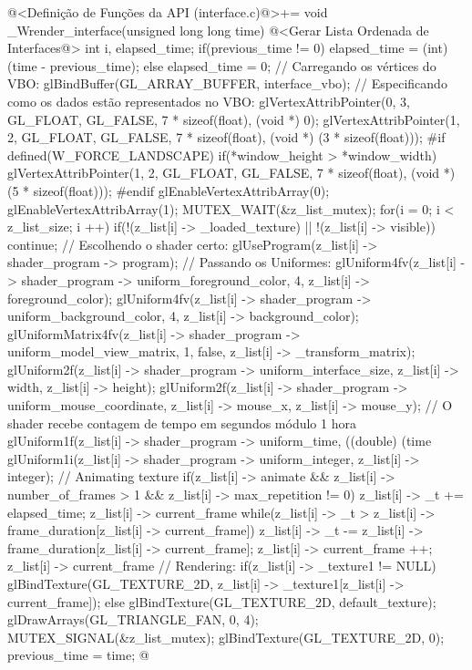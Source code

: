 \iniciocodigo
@<Definição de Funções da API (interface.c)@>+=
void _Wrender_interface(unsigned long long time){
  @<Gerar Lista Ordenada de Interfaces@>
  {
    int i, elapsed_time;
    if(previous_time != 0)
      elapsed_time = (int) (time - previous_time);
    else
      elapsed_time = 0;
    // Carregando os vértices do VBO:
    glBindBuffer(GL_ARRAY_BUFFER, interface_vbo);
    // Especificando como os dados estão representados no VBO:
    glVertexAttribPointer(0, 3, GL_FLOAT, GL_FALSE, 7 * sizeof(float),
                          (void *) 0);
    glVertexAttribPointer(1, 2, GL_FLOAT, GL_FALSE, 7 * sizeof(float),
                          (void *) (3 * sizeof(float)));
#if defined(W_FORCE_LANDSCAPE)
    if(*window_height > *window_width)
      glVertexAttribPointer(1, 2, GL_FLOAT, GL_FALSE, 7 * sizeof(float),
                            (void *) (5 * sizeof(float)));
#endif
    glEnableVertexAttribArray(0);
    glEnableVertexAttribArray(1);
    MUTEX_WAIT(&z_list_mutex);
    for(i = 0; i < z_list_size; i ++){
      if(!(z_list[i] -> _loaded_texture) || !(z_list[i] -> visible))
        continue;
      // Escolhendo o shader certo:
      glUseProgram(z_list[i] -> shader_program -> program);
      // Passando os Uniformes:
      glUniform4fv(z_list[i] -> shader_program -> uniform_foreground_color, 4,
                   z_list[i] -> foreground_color);
      glUniform4fv(z_list[i] -> shader_program -> uniform_background_color, 4,
                   z_list[i] -> background_color);
      glUniformMatrix4fv(z_list[i] -> shader_program ->
                           uniform_model_view_matrix, 1, false,
                         z_list[i] -> _transform_matrix);
      glUniform2f(z_list[i] -> shader_program -> uniform_interface_size,
                  z_list[i] -> width, z_list[i] -> height);
      glUniform2f(z_list[i] -> shader_program -> uniform_mouse_coordinate,
                  z_list[i] -> mouse_x, z_list[i] -> mouse_y);
      // O shader recebe contagem de tempo em segundos módulo 1 hora
      glUniform1f(z_list[i] -> shader_program -> uniform_time,
                  ((double) (time %
      glUniform1i(z_list[i] -> shader_program -> uniform_integer,
                 z_list[i] -> integer);
      // Animating texture
      if(z_list[i] -> animate && z_list[i] -> number_of_frames > 1 &&
         z_list[i] -> max_repetition != 0){
        z_list[i] -> _t += elapsed_time;
        z_list[i] -> current_frame %
        while(z_list[i] -> _t >
                     z_list[i] -> frame_duration[z_list[i] -> current_frame]){
          z_list[i] -> _t -=
            z_list[i] -> frame_duration[z_list[i] -> current_frame];
          z_list[i] -> current_frame ++;
          z_list[i] -> current_frame %
        }
      }
      // Rendering:
      if(z_list[i] -> _texture1 != NULL)
        glBindTexture(GL_TEXTURE_2D,
                      z_list[i] -> _texture1[z_list[i] -> current_frame]);
      else
        glBindTexture(GL_TEXTURE_2D, default_texture);
      glDrawArrays(GL_TRIANGLE_FAN, 0, 4);
    }
    MUTEX_SIGNAL(&z_list_mutex);
    glBindTexture(GL_TEXTURE_2D, 0);
  }
  previous_time = time;
}
@
\fimcodigo

